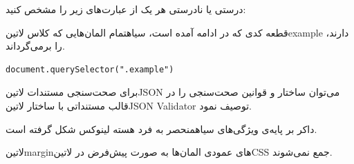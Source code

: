 
درستی یا نادرستی هر یک از عبارت‌های زیر را مشخص کنید:


 قطعه کدی که در ادامه آمده است، ‌سیاه{تمام} المان‌هایی که کلاس ‌لاتین{example} دارند، را برمی‌گرداند.

\begin{latin}
\begin{verbatim}
document.querySelector(".example")
\end{verbatim}
\end{latin}

 برای صحت‌سنجی مستندات ‌لاتین{JSON} می‌توان ساختار و قوانین صحت‌سنجی را در قالب مستنداتی با ساختار ‌لاتین{JSON Validator} توصیف نمود.

 داکر بر پایه‌ی ویژگی‌های ‌سیاه{منحصر به فرد} هسته لینوکس شکل گرفته است.

 ‌لاتین{margin}های عمودی المان‌ها به صورت پیش‌فرض در ‌لاتین{CSS} جمع نمی‌شوند.



